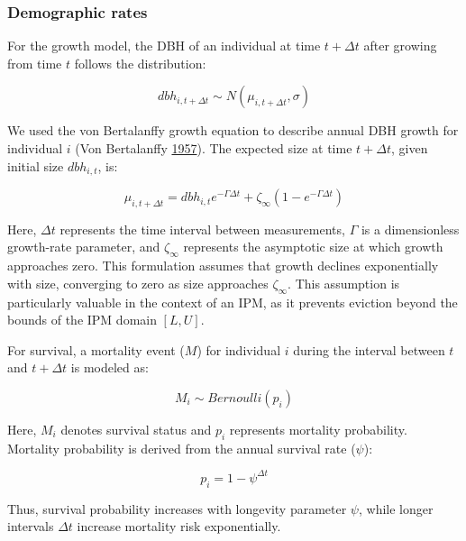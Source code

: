 \documentclass[12pt]{article}
\begin{document}
\hypertarget{demographic-rates}{%
\subsubsection{Demographic rates}\label{demographic-rates}}

For the growth model, the DBH of an individual at time \(t + \Delta t\)
after growing from time \(t\) follows the distribution:

\begin{equation}
dbh_{i,t + \Delta t} \sim N(\mu_{i, t+\Delta t}, \sigma)
\label{eq:VBlik}\end{equation}

We used the von Bertalanffy growth equation to describe annual DBH
growth for individual \(i\) (Von Bertalanffy
\protect\hyperlink{ref-von1957quantitative}{1957}). The expected size at
time \(t + \Delta t\), given initial size \(dbh_{i,t}\), is:

\begin{equation}
\mu_{i, t+\Delta t} = dbh_{i,t} e^{-\Gamma \Delta t} + \zeta_{\infty} (1 - e^{-\Gamma \Delta t})
\label{eq:VBmodel}\end{equation}

Here, \(\Delta t\) represents the time interval between measurements,
\(\Gamma\) is a dimensionless growth-rate parameter, and
\(\zeta_{\infty}\) represents the asymptotic size at which growth
approaches zero. This formulation assumes that growth declines
exponentially with size, converging to zero as size approaches
\(\zeta_{\infty}\). This assumption is particularly valuable in the
context of an IPM, as it prevents eviction beyond the bounds of the IPM
domain \([L,U]\).

For survival, a mortality event (\(M\)) for individual \(i\) during the
interval between \(t\) and \(t+\Delta t\) is modeled as:

\begin{equation}
M_i \sim Bernoulli(p_i)
\label{eq:survL}\end{equation}

Here, \(M_i\) denotes survival status and \(p_i\) represents mortality
probability. Mortality probability is derived from the annual survival
rate (\(\psi\)):

\begin{equation}
p_i = 1 - \psi^{\Delta t}
\label{eq:survP}\end{equation}

Thus, survival probability increases with longevity parameter \(\psi\),
while longer intervals \(\Delta t\) increase mortality risk
exponentially.
\end{document}
